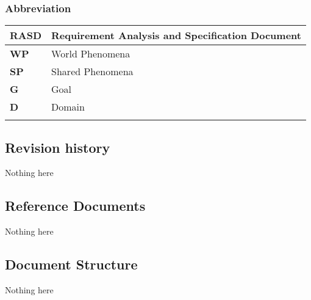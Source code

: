 \subsubsection*{Abbreviation}
\begin{table}[h]
    \begin{tabular}{|l|l|}
        \toprule
        \textbf{RASD} & Requirement Analysis and Specification Document \\ \midrule
        \textbf{WP}   & World Phenomena                                 \\ \midrule
        \textbf{SP}   & Shared Phenomena                                \\ \midrule
        \textbf{G}    & Goal                                            \\ \midrule
        \textbf{D}    & Domain                                          \\ \midrule
                      &                                                 \\ \bottomrule
    \end{tabular}
\end{table}
\subsection{Revision history}
Nothing here

\subsection{Reference Documents}
Nothing here

\subsection{Document Structure}
Nothing here
